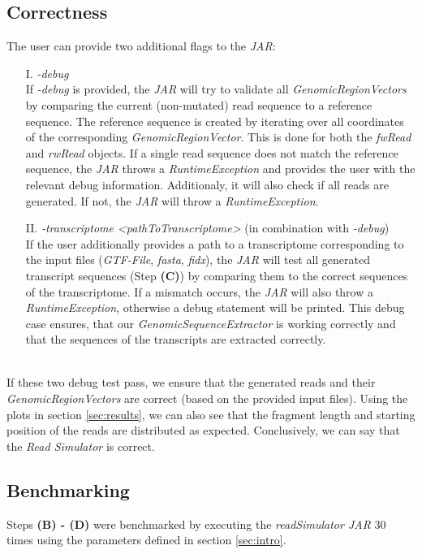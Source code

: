 \documentclass[12pt]{article}
\begin{document}
\subsection{Correctness}
The user can provide two additional flags to the \textit{JAR}:
\begin{enumerate}
	\item[I.] \textit{-debug}\\
		If \textit{-debug} is provided, the \textit{JAR} will try to validate all \textit{GenomicRegionVectors} by comparing the current (non-mutated) read sequence
		to a reference sequence. The reference sequence is created by iterating over all coordinates of the corresponding \textit{GenomicRegionVector}.
		This is done for both the \textit{fwRead} and \textit{rwRead} objects. If a single read sequence does not match the reference sequence,
		the \textit{JAR} throws a \textit{RuntimeException} and provides the user with the relevant debug information.
        Additionaly, it will also check if all reads are generated. If not, the \textit{JAR} will throw a \textit{RuntimeException}.

	\item[II.] \textit{-transcriptome <pathToTranscriptome>} (in combination with \textit{-debug})\\
		If the user additionally provides a path to a transcriptome corresponding to the input files (\textit{GTF-File}, \textit{fasta}, \textit{fidx}), the \textit{JAR} will
		test all generated transcript sequences (Step \textbf{(C)}) by comparing them to the correct sequences of the transcriptome. If a mismatch
		occurs, the \textit{JAR} will also throw a \textit{RuntimeException}, otherwise a debug statement will be printed.
        This debug case ensures, that our \textit{GenomicSequenceExtractor} is working correctly and that the sequences of the transcripts are extracted correctly.
\end{enumerate}
\hspace{0.1mm} \\
If these two debug test pass, we ensure that the generated reads and their \textit{GenomicRegionVectors} are correct (based on the provided input files).
Using the plots in section \ref{sec:results}, we can also see that the fragment length and starting position of the reads are distributed as expected.
Conclusively, we can say that the \textit{Read Simulator} is correct.


\newpage

\subsection{Benchmarking}
Steps \textbf{(B) - (D)} were benchmarked by executing the \textit{readSimulator JAR} 30 times using the parameters defined in section \ref{sec:intro}.
\end{document}
